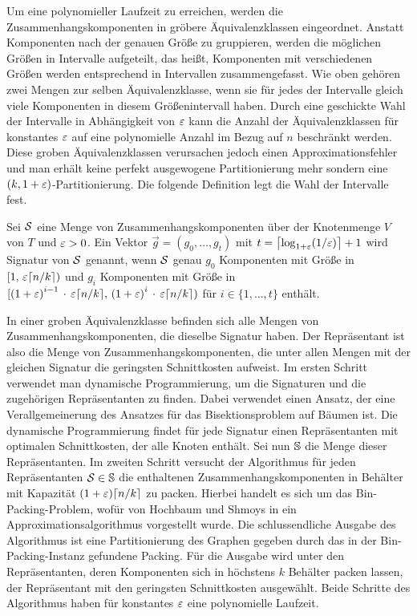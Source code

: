 Um eine polynomieller Laufzeit zu erreichen, werden die Zusammenhangskomponenten in gröbere Äquivalenzklassen eingeordnet.
Anstatt Komponenten nach der genauen Größe zu gruppieren, werden die möglichen Größen in Intervalle aufgeteilt, das heißt, Komponenten mit verschiedenen Größen werden entsprechend in Intervallen zusammengefasst. 
Wie oben gehören zwei Mengen zur selben Äquivalenzklasse, wenn sie für jedes der Intervalle gleich viele Komponenten in diesem Größenintervall haben.
Durch eine geschickte Wahl der Intervalle in Abhängigkeit von $\eps$ kann die Anzahl der Äquivalenzklassen für konstantes $\eps$ auf eine polynomielle Anzahl im Bezug auf $n$ beschränkt werden.
Diese groben Äquivalenzklassen verursachen jedoch einen Approximationsfehler und man erhält keine perfekt ausgewogene Partitionierung mehr sondern eine $(k, 1+\eps)$\hyp Partitionierung. Die folgende Definition legt die Wahl der Intervalle fest.

\begin{defn}[Signatur]\label{defn:signature}
    Sei $\calS$ eine Menge von Zusammenhangskomponenten über der Knotenmenge $V$ von $T$ und $\eps > 0$. Ein Vektor $\vec{g} = (g_0, \ldots, g_t)$ mit $t = \ceil*{\log_{1+\eps}(1/\eps)} + 1$ wird Signatur von $\calS$ genannt, wenn $\calS$ genau $g_0$ Komponenten mit Größe in $[1,\, \eps \ceil*{n/k})$ und $g_i$ Komponenten mit Größe in $[{(1+\eps)}^{i-1}\, \cdot\, \eps \ceil*{n/k},\, {(1+\eps)}^i\, \cdot \, \eps \ceil*{n/k})$ für $i \in \{1, \ldots, t\}$ enthält.
\end{defn}

In einer groben Äquivalenzklasse befinden sich alle Mengen von Zusammenhangskomponenten, die dieselbe Signatur haben.
Der Repräsentant ist also die Menge von Zusammenhangskomponenten, die unter allen Mengen mit der gleichen Signatur die geringsten Schnittkosten aufweist.
Im ersten Schritt verwendet man dynamische Programmierung, um die Signaturen und die zugehörigen Repräsentanten zu finden.
Dabei verwendet einen Ansatz, der eine Verallgemeinerung des Ansatzes für das Bisektionsproblem auf Bäumen ist. \parencite{mcg78, ws11}
Die dynamische Programmierung findet für jede Signatur einen Repräsentanten mit optimalen Schnittkosten, der alle Knoten enthält.
Sei nun $\bbS$ die Menge dieser Repräsentanten.
Im zweiten Schritt versucht der Algorithmus für jeden Repräsentanten $\calS \in \bbS$ die enthaltenen Zusammenhangskomponenten in Behälter mit Kapazität $(1+\eps)\ceil*{n/k}$ zu packen. 
Hierbei handelt es sich um das Bin-Packing-Problem, wofür von Hochbaum und Shmoys in \parencite{hs86} ein Approximationsalgorithmus vorgestellt wurde.
Die schlussendliche Ausgabe des Algorithmus ist eine Partitionierung des Graphen gegeben durch das in der Bin-Packing-Instanz gefundene Packing.
Für die Ausgabe wird unter den Repräsentanten, deren Komponenten sich in höchstens $k$ Behälter packen lassen, der Repräsentant mit den geringsten Schnittkosten ausgewählt.
Beide Schritte des Algorithmus haben für konstantes $\eps$ eine polynomielle Laufzeit.


